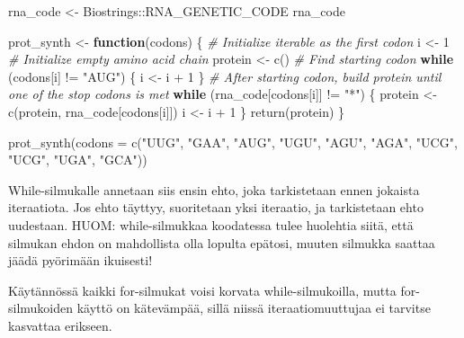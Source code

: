 \documentclass[
]{book}
\newenvironment{Shaded}{\begin{snugshade}}{\end{snugshade}}
\newcommand{\AttributeTok}[1]{\textcolor[rgb]{0.77,0.63,0.00}{#1}}
\newcommand{\CommentTok}[1]{\textcolor[rgb]{0.56,0.35,0.01}{\textit{#1}}}
\newcommand{\ControlFlowTok}[1]{\textcolor[rgb]{0.13,0.29,0.53}{\textbf{#1}}}
\newcommand{\DecValTok}[1]{\textcolor[rgb]{0.00,0.00,0.81}{#1}}
\newcommand{\FunctionTok}[1]{\textcolor[rgb]{0.00,0.00,0.00}{#1}}
\newcommand{\NormalTok}[1]{#1}
\newcommand{\OtherTok}[1]{\textcolor[rgb]{0.56,0.35,0.01}{#1}}
\newcommand{\SpecialCharTok}[1]{\textcolor[rgb]{0.00,0.00,0.00}{#1}}
\newcommand{\StringTok}[1]{\textcolor[rgb]{0.31,0.60,0.02}{#1}}
\begin{document}
\begin{Shaded}
\begin{Highlighting}[]
\NormalTok{rna\_code }\OtherTok{\textless{}{-}}\NormalTok{ Biostrings}\SpecialCharTok{::}\NormalTok{RNA\_GENETIC\_CODE}
\NormalTok{rna\_code}
\end{Highlighting}
\end{Shaded}

\begin{Shaded}
\begin{Highlighting}[]
\NormalTok{prot\_synth }\OtherTok{\textless{}{-}} \ControlFlowTok{function}\NormalTok{(codons) \{}
  \CommentTok{\# Initialize iterable as the first codon}
\NormalTok{  i }\OtherTok{\textless{}{-}} \DecValTok{1}
  \CommentTok{\# Initialize empty amino acid chain}
\NormalTok{  protein }\OtherTok{\textless{}{-}} \FunctionTok{c}\NormalTok{()}
  \CommentTok{\# Find starting codon}
  \ControlFlowTok{while}\NormalTok{ (codons[i] }\SpecialCharTok{!=} \StringTok{"AUG"}\NormalTok{) \{}
\NormalTok{    i }\OtherTok{\textless{}{-}}\NormalTok{ i }\SpecialCharTok{+} \DecValTok{1}
\NormalTok{  \}}
  \CommentTok{\# After starting codon, build protein until one of the stop codons is met}
  \ControlFlowTok{while}\NormalTok{ (rna\_code[codons[i]] }\SpecialCharTok{!=} \StringTok{"*"}\NormalTok{) \{}
\NormalTok{    protein }\OtherTok{\textless{}{-}} \FunctionTok{c}\NormalTok{(protein, rna\_code[codons[i]])}
\NormalTok{    i }\OtherTok{\textless{}{-}}\NormalTok{ i }\SpecialCharTok{+} \DecValTok{1}
\NormalTok{  \}}
  \FunctionTok{return}\NormalTok{(protein)}
\NormalTok{\}}

\FunctionTok{prot\_synth}\NormalTok{(}\AttributeTok{codons =} \FunctionTok{c}\NormalTok{(}\StringTok{"UUG"}\NormalTok{, }\StringTok{"GAA"}\NormalTok{, }\StringTok{"AUG"}\NormalTok{, }\StringTok{"UGU"}\NormalTok{, }\StringTok{"AGU"}\NormalTok{, }\StringTok{"AGA"}\NormalTok{, }\StringTok{"UCG"}\NormalTok{, }\StringTok{"UCG"}\NormalTok{, }\StringTok{"UGA"}\NormalTok{, }\StringTok{"GCA"}\NormalTok{))}
\end{Highlighting}
\end{Shaded}

While-silmukalle annetaan siis ensin ehto, joka tarkistetaan ennen jokaista iteraatiota. Jos ehto täyttyy, suoritetaan yksi iteraatio, ja tarkistetaan ehto uudestaan. HUOM: while-silmukkaa koodatessa tulee huolehtia siitä, että silmukan ehdon on mahdollista olla lopulta epätosi, muuten silmukka saattaa jäädä pyörimään ikuisesti!

Käytännössä kaikki for-silmukat voisi korvata while-silmukoilla, mutta for-silmukoiden käyttö on kätevämpää, sillä niissä iteraatiomuuttujaa ei tarvitse kasvattaa erikseen.
\end{document}
